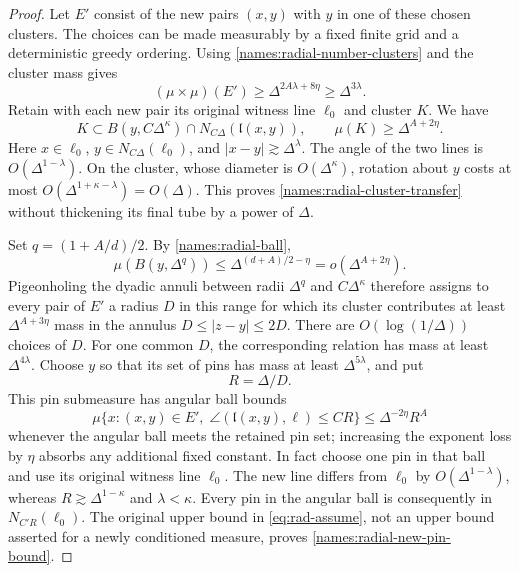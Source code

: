 \begin{proof}
Let $E'$ consist of the new pairs $(x,y)$ with $y$ in one of
these chosen clusters.  The choices can be made measurably by
a fixed finite grid and a deterministic greedy ordering.  Using
\eqref{names:radial-number-clusters} and the cluster mass gives
\[
 (\mu\times\mu)(E')
    \geq\Delta^{2A\lambda+8\eta}\geq\Delta^{3\lambda}.
\]
Retain with each new pair its original witness line $\ell_0$
and cluster $K$.  We have
\begin{equation}\label{names:radial-cluster-transfer}
 K\subset B(y,C\Delta^\kappa)
              \cap N_{C\Delta}(\mathfrak l(x,y)),
 \qquad \mu(K)\geq\Delta^{A+2\eta}.
\end{equation}
Here $x\in\ell_0$, $y\in N_{C\Delta}(\ell_0)$, and
$|x-y|\gtrsim\Delta^\lambda$.  The angle of the two lines is
$O(\Delta^{1-\lambda})$.  On the cluster, whose diameter is
$O(\Delta^\kappa)$, rotation about $y$ costs at most
$O(\Delta^{1+\kappa-\lambda})=O(\Delta)$.  This proves
\eqref{names:radial-cluster-transfer} without thickening its
final tube by a power of $\Delta$.

Set $q=(1+A/d)/2$.  By \eqref{names:radial-ball},
\[
 \mu(B(y,\Delta^q))\leq\Delta^{(d+A)/2-\eta}
                         =o(\Delta^{A+2\eta}).
\]
Pigeonholing the dyadic annuli between radii $\Delta^q$ and
$C\Delta^\kappa$ therefore assigns to every pair of $E'$
a radius $D$ in this range for which its cluster contributes
at least $\Delta^{A+3\eta}$ mass in the annulus
$D\leq|z-y|\leq2D$.  There are $O(\log(1/\Delta))$
choices of $D$.  For one common $D$, the corresponding relation
has mass at least $\Delta^{4\lambda}$.  Choose $y$ so that
its set of pins has mass at least $\Delta^{5\lambda}$, and put
\[
 R=\Delta/D.
\]
This pin submeasure has angular ball bounds
\begin{equation}\label{names:radial-new-pin-bound}
 \mu\{x:(x,y)\in E',\;
             \angle(\mathfrak l(x,y),\ell)\leq CR\}
       \leq\Delta^{-2\eta}R^A
\end{equation}
whenever the angular ball meets the retained pin set; increasing
the exponent loss by $\eta$ absorbs any additional fixed constant.
In fact choose one pin in that ball and use its original witness
line $\ell_0$.  The new line differs from $\ell_0$ by
$O(\Delta^{1-\lambda})$, whereas
$R\gtrsim\Delta^{1-\kappa}$ and $\lambda<\kappa$.
Every pin in the angular ball is consequently in
$N_{C'R}(\ell_0)$.  The original upper bound in
\eqref{eq:rad-assume}, not an upper bound asserted for a newly
conditioned measure, proves \eqref{names:radial-new-pin-bound}.


\end{proof}
